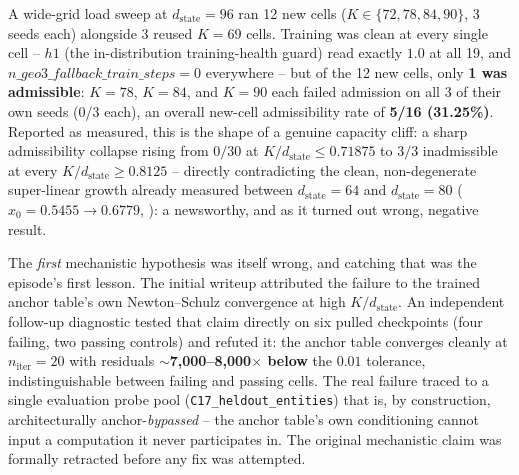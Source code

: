 \documentclass[10pt,letterpaper]{article}
\newcommand{\dstate}{d_{\mathrm{state}}}
\newcommand{\niter}{n_{\mathrm{iter}}}
\begin{document}
A wide-grid load sweep at $\dstate=96$ ran 12 new cells
($K\in\{72,78,84,90\}$, 3 seeds each) alongside 3 reused $K{=}69$ cells.
Training was clean at every single cell -- $h1$ (the in-distribution
training-health guard) read exactly $1.0$ at all 19, and
$n\_geo3\_fallback\_train\_steps=0$ everywhere -- but of the 12 new
cells, only \textbf{1 was admissible}: $K{=}78$, $K{=}84$, and $K{=}90$
each failed admission on all 3 of their own seeds (0/3 each), an overall
new-cell admissibility rate of \textbf{5/16 (31.25\%)}.
Reported as measured, this is the shape of a genuine capacity cliff: a
sharp admissibility collapse rising from $0/30$ at $K/\dstate \le 0.71875$
to $3/3$ inadmissible at every $K/\dstate \ge 0.8125$ -- directly
contradicting the clean, non-degenerate super-linear growth already
measured between $\dstate=64$ and $\dstate=80$
($x_0 = 0.5455 \to 0.6779$, \citealp{larson2026capacitycliff}): a
newsworthy, and as it turned out wrong, negative result.

The \emph{first} mechanistic hypothesis was itself wrong, and catching
that was the episode's first lesson. The initial writeup attributed the
failure to the trained anchor table's own Newton--Schulz convergence at
high $K/\dstate$. An independent follow-up diagnostic tested that claim
directly on six pulled checkpoints (four failing, two passing controls)
and refuted it: the anchor table converges cleanly at $\niter=20$ with
residuals \textbf{$\sim$7{,}000--8{,}000$\times$ below} the $0.01$
tolerance, indistinguishable between failing and passing cells. The real
failure traced to a single evaluation probe pool
(\texttt{C17\_heldout\_entities}) that is, by construction, architecturally
anchor-\emph{bypassed} -- the anchor table's own conditioning cannot input
a computation it never participates in. The original mechanistic claim
was formally retracted before any fix was attempted.
\end{document}

